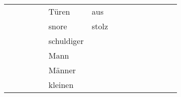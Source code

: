 \begin{center}
\begin{tabular}{lllllllllllllll}
       &            &                       &         &          &                 Türen &                                     aus &                                         &                                                    &                                         &                                                    &                                         &                                         &          &        \\
       &            &                       &         &          &                 snore &                                   stolz &                                         &                                                    &                                         &                                                    &                                         &                                         &          &        \\
       &            &                       &         &          &            schuldiger &                                         &                                         &                                                    &                                         &                                                    &                                         &                                         &          &        \\
       &            &                       &         &          &                  Mann &                                         &                                         &                                                    &                                         &                                                    &                                         &                                         &          &        \\
       &            &                       &         &          &                Männer &                                         &                                         &                                                    &                                         &                                                    &                                         &                                         &          &        \\
       &            &                       &         &          &               kleinen &                                         &                                         &                                                    &                                         &                                                    &                                         &                                         &          &        \\

\end{tabular}
\end{center}
